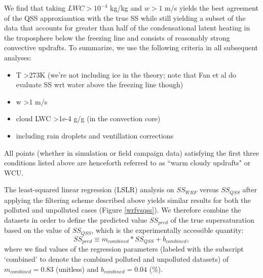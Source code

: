 \documentclass{article}
\begin{document}
We find that taking $LWC > 10^{-4}$ kg/kg and $w>1$ m/s yields the best agreement of the QSS approxiamtion with the true SS while still yielding a subset of the data that accounts for greater than half of the condensational latent heating in the troposphere below the freezing line and consists of reasonably strong convective updrafts. To summarize, we use the following criteria in all subsequent analyses:
\begin{itemize}
	\item T \textgreater  273K (we're not including ice in the theory; note that Fan et al do evaluate SS wrt water above the freezing line though)
	\item w \textgreater  1 m/s
	\item cloud LWC \textgreater  1e-4 g/g (in the convection core) 
	\item including rain droplets and ventillation corrections
\end{itemize}
All points (whether in simulation or field campaign data) satisfying the first three conditions listed above are henceforth referred to as ``warm cloudy updrafts" or WCU. 

The least-squared linear regression (LSLR) analysis on $SS_{WRF}$ versus $SS_{QSS}$ after applying the filtering scheme described above yields similar results for both the polluted and unpolluted cases (Figure \ref{wrfvsqss}). We therefore combine the datasets in order to define the predicted value $SS_{pred}$ of the true supersaturation based on the value of $SS_{QSS}$, which is the experimentally accessible quantity:
\begin{equation}
\label{sspred}
SS_{pred} \equiv m_{combined}*SS_{QSS} + b_{combined},
\end{equation}
where we find values of the regression parameters (labeled with the subscript `combined' to denote the combined polluted and unpolluted datasets) of $m_{combined}=0.83$ (unitless) and $b_{combined}=0.04$ (\%).
\end{document}
